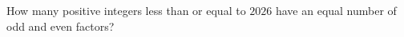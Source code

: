 How many positive integers less than or equal to $2026$ have an equal number of odd and even factors?
